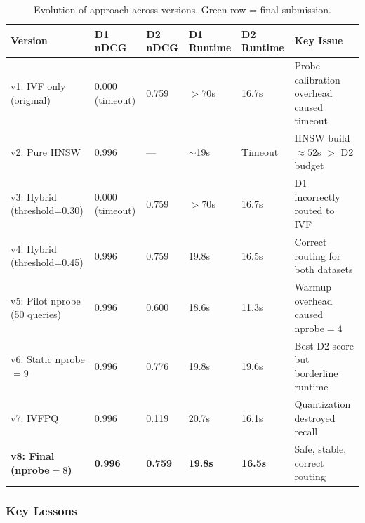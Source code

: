\documentclass[11pt,a4paper]{article}
\begin{document}
\begin{table}[H]
\centering
\renewcommand{\arraystretch}{1.35}
\caption{Evolution of approach across versions. \colorbox{successrow}{Green row} = final submission.}
\label{tab:evolution}
\small
\begin{tabular}{p{2.4cm} p{1.5cm} p{1.5cm} p{1.8cm} p{1.8cm} p{3.8cm}}
\toprule
\rowcolor{tableheader}
\color{white}Version &
\color{white}D1 nDCG &
\color{white}D2 nDCG &
\color{white}D1 Runtime &
\color{white}D2 Runtime &
\color{white}Key Issue \\
\midrule
\rowcolor{rowA}
v1: IVF only (original) & 0.000 (timeout) & 0.759 & $>70$s & 16.7s &
  Probe calibration overhead caused timeout \\
\rowcolor{rowB}
v2: Pure HNSW & 0.996 & --- & $\sim$19s & Timeout &
  HNSW build $\approx52$s $>$ D2 budget \\
\rowcolor{rowA}
v3: Hybrid (threshold=0.30) & 0.000 (timeout) & 0.759 & $>70$s & 16.7s &
  D1 incorrectly routed to IVF \\
\rowcolor{rowB}
v4: Hybrid (threshold=0.45) & 0.996 & 0.759 & 19.8s & 16.5s &
  Correct routing for both datasets \\
\rowcolor{rowA}
v5: Pilot nprobe (50 queries) & 0.996 & 0.600 & 18.6s & 11.3s &
  Warmup overhead caused nprobe$=4$ \\
\rowcolor{rowB}
v6: Static nprobe$=9$ & 0.996 & 0.776 & 19.8s & 19.6s &
  Best D2 score but borderline runtime \\
\rowcolor{rowA}
v7: IVFPQ & 0.996 & 0.119 & 20.7s & 16.1s &
  Quantization destroyed recall \\
\rowcolor{successrow}
\textbf{v8: Final (nprobe$=8$)} & \textbf{0.996} & \textbf{0.759} &
  \textbf{19.8s} & \textbf{16.5s} &
  Safe, stable, correct routing \\
\bottomrule
\end{tabular}
\end{table}

\subsubsection*{Key Lessons}
\end{document}
